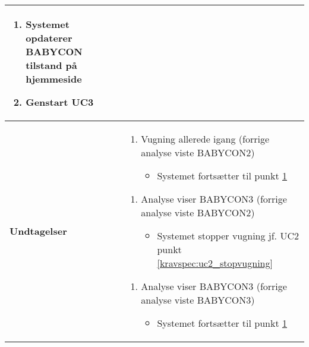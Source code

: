 \begin{center}
\begin{longtable}{|p{5cm}|p{9cm}|}
\begin{enumerate}
				\item \label{kravspec:uc3_opdatering}Systemet opdaterer BABYCON tilstand på hjemmeside 	
				\newline [Und: \ref{kravspec:uc3_opdatering}.a Ingen netværksforbindelse]			
				
				\item Genstart UC3				
				
			\end{enumerate}
		\\\hline
		\textbf{Undtagelser}
			&\begin{enumerate}[label=\ref{kravspec:uc3_lydanalyse}.a]
			\item Vugning allerede igang (forrige analyse viste BABYCON2)
					\begin{itemize}
					\item Systemet fortsætter til punkt \ref{kravspec:uc3_opdatering}
					\end{itemize}
			\end{enumerate}
			\begin{enumerate}[label=\ref{kravspec:uc3_lydanalyse}.b]
			\item Analyse viser BABYCON3 (forrige analyse viste BABYCON2)
					\begin{itemize}
					\item Systemet stopper vugning jf. UC2 punkt \ref{kravspec:uc2_stopvugning}
					\end{itemize}
			\end{enumerate}
			\begin{enumerate}[label=\ref{kravspec:uc3_lydanalyse}.c]
			\item Analyse viser BABYCON3 (forrige analyse viste BABYCON3)
					\begin{itemize}
					\item Systemet fortsætter til punkt \ref{kravspec:uc3_opdatering}

\end{itemize}
\end{enumerate}
\end{longtable}
\end{center}
